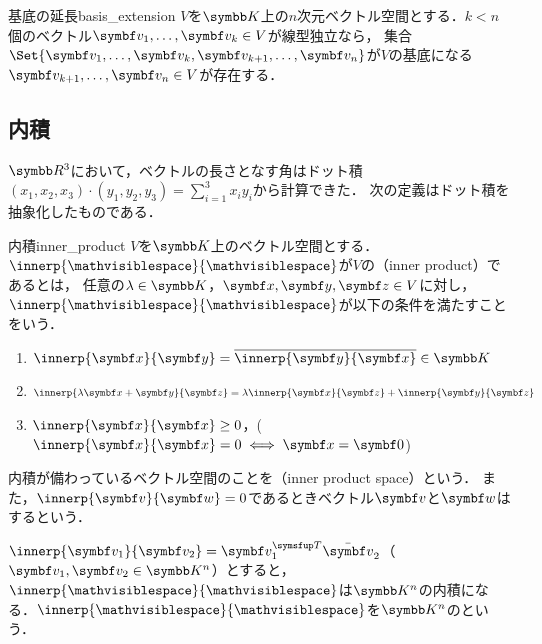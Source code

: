 \documentclass[../../main]{subfiles}
\begin{document}
\begin{proposition}{基底の延長}{basis_extension}
  \(V\)を\(\numset{K}\)上の\(n\)次元ベクトル空間とする．\(k<n\)個のベクトル\(\vect{v}_1,\dots,\vect{v}_k\in V\)が線型独立なら，
  集合\(\Set{\vect{v}_1,\dots,\vect{v}_k,\vect{v}_{k+1},\dots,\vect{v}_n}\)が\(V\)の基底になる\(\vect{v}_{k+1},\dots,\vect{v}_n\in V\)が存在する．
\end{proposition}

\subsection{内積}

\(\numset{R}^3\)において，ベクトルの長さとなす角はドット積\((x_1,x_2,x_3)\cdot(y_1,y_2,y_3)=\sum_{i=1}^3x_iy_i\)から計算できた．
次の定義はドット積を抽象化したものである．

\begin{definition}{内積}{inner_product}\indexsymbol{\(\innerp{\holder}{\holder}\)}
  \(V\)を\(\numset{K}\)上のベクトル空間とする．\(\innerp{\holder}{\holder}\)が\(V\)の（inner product）であるとは，
  任意の\(\lambda\in\numset{K}\)，\(\vect{x},\vect{y},\vect{z}\in V\)に対し，\(\innerp{\holder}{\holder}\)が以下の条件を満たすことをいう．
  \begin{enumerate}
    \item \(\innerp{\vect{x}}{\vect{y}}=\conj*{\innerp{\vect{y}}{\vect{x}}}\in\numset{K}\)
    \item \(\innerp{\lambda\vect{x}+\vect{y}}{\vect{z}}=\lambda\innerp{\vect{x}}{\vect{z}}+\innerp{\vect{y}}{\vect{z}}\)
    \item \(\innerp{\vect{x}}{\vect{x}}\geq 0\)，(\(\innerp{\vect{x}}{\vect{x}}=0\iff\vect{x}=\zvec\))
  \end{enumerate}
\end{definition}

内積が備わっているベクトル空間のことを（inner product space）という．
また，\(\innerp{\vect{v}}{\vect{w}}=0\)であるときベクトル\(\vect{v}\)と\(\vect{w}\)はするという．

\begin{example}[標準内積]
  \(\innerp{\vect{v}_1}{\vect{v}_2}=\trps{\vect{v}_1}\conj{\vect{v}}_2\)（\(\vect{v}_1,\vect{v}_2\in\numset{K}^n\)）とすると，
  \(\innerp{\holder}{\holder}\)は\(\numset{K}^n\)の内積になる．\(\innerp{\holder}{\holder}\)を\(\numset{K}^n\)のという．
\end{example}
\end{document}
